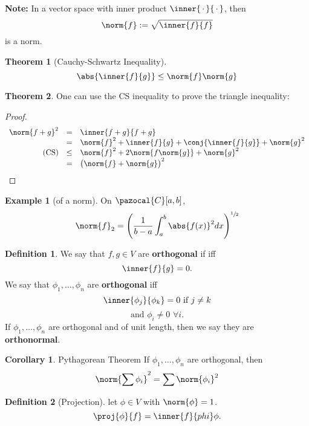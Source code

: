 \documentclass[a5paper]{article}
\theoremstyle{definition}%
\newtheorem*{theorem*}{Theorem} %
\newtheorem*{corollary*}{Corollary}
\newtheorem*{definition*}{Definition}
\newtheorem*{example*}{Example}
\numberwithin{exercise}{section}
\theoremstyle{remark}%
\begin{document}
\begin{highlight}
\textbf{Note:} In a vector space with inner product $\inner{\,\cdot\,}{\,\cdot\,}$, then 
$$\norm{f}:=\sqrt{\inner{f}{f}}$$
is a norm. 
\end{highlight}

\begin{theorem*}[Cauchy-Schwartz Inequality]
$$\abs{\inner{f}{g}}\leq\norm{f}\norm{g}$$
\end{theorem*}

\begin{theorem*}
One can use the CS inequality to prove the triangle inequality:
\end{theorem*}
\begin{proof}
\[\begin{array}{rcl}
\norm{f+g}^2&=&\inner{f+g}{f+g}\\
&=&\norm{f}^2+\inner{f}{g}+\conj{\inner{f}{g}}+\norm{g}^2\\
\text{(CS)}&\leq&\norm{f}^2+2\norm{f\norm{g}}+\norm{g}^2\\
&=&\big(\norm{f}+\norm{g}\big)^2\\
\end{array}\]
\end{proof}

\begin{example*}[of a norm]
On $\pazocal{C}[a,b]$, 
$$\norm{f}_2=\left(\frac{1}{b-a}\int_a^b \abs{f(x)}^2 dx \right)^{\sfrac{1}{2}}$$
\end{example*}

\begin{highlight}
\begin{definition*}
We say that $f,g\in V$ are \textbf{orthogonal} if iff 
$$\inner{f}{g}=0.$$
We say that $\phi_1, \dots, \phi_n$ are \textbf{orthogonal} iff
$$\inner{\phi_j}{\phi_k}=0 \text{ if } j\neq k$$
$$\text{and } \phi_i\neq0 \, \, \forall i.$$
If $\phi_1, \dots, \phi_n$ are orthogonal and of unit length, then we say they are \textbf{orthonormal}. 
\end{definition*}
\end{highlight}

\begin{corollary*}{Pythagorean Theorem}
If $\phi_1, \dots, \phi_n$ are orthogonal, then 
$$\norm{\sum \phi_i}^2=\sum\norm{\phi_i}^2$$
\end{corollary*}

\begin{highlight}
\begin{definition*}[Projection] let $\phi\in V$ with $\norm{\phi}=1$. 
$$\proj{\phi}{f}=\inner{f}{phi}\phi.$$
\end{definition*}
\end{highlight}
\end{document}
